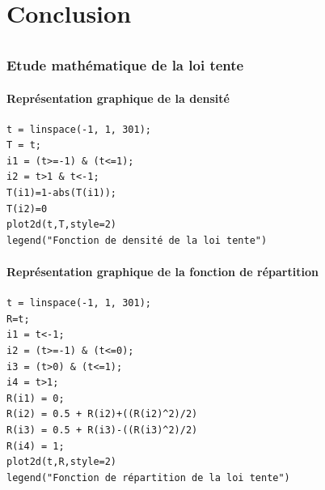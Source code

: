 \documentclass{article}
\begin{document}
\part{Conclusion}
\paragraph{}

\newpage
\appendix

\section{Etude mathématique de la loi tente}
\subsection{Représentation graphique de la densité}
\begin{verbatim}
t = linspace(-1, 1, 301);
T = t;
i1 = (t>=-1) & (t<=1);
i2 = t>1 & t<-1;
T(i1)=1-abs(T(i1));
T(i2)=0
plot2d(t,T,style=2)
legend("Fonction de densité de la loi tente")
\end{verbatim}

\subsection{Représentation graphique de la fonction de répartition}
\begin{verbatim}
t = linspace(-1, 1, 301);
R=t;
i1 = t<-1;
i2 = (t>=-1) & (t<=0);
i3 = (t>0) & (t<=1);
i4 = t>1;
R(i1) = 0;
R(i2) = 0.5 + R(i2)+((R(i2)^2)/2)
R(i3) = 0.5 + R(i3)-((R(i3)^2)/2)
R(i4) = 1;
plot2d(t,R,style=2)
legend("Fonction de répartition de la loi tente")
\end{verbatim}



\begin{verbatim}
\end{verbatim}

\end{document}
